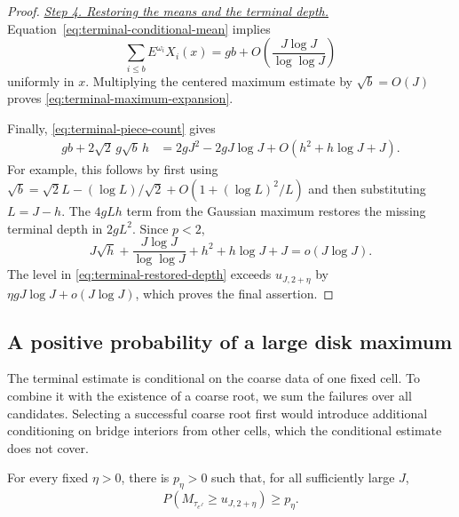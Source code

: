 \begin{proof}
\smallskip\noindent
\underline{\textit{Step 4. Restoring the means and the terminal depth.}}
Equation~\eqref{eq:terminal-conditional-mean} implies
\[
 \sum_{i\le b}E^{\omega_i}X_i(x)
 =gb+O\left(\frac{J\log J}{\log\log J}\right)
\]
uniformly in $x$.  Multiplying the centered maximum estimate by
$\sqrt b=O(J)$ proves \eqref{eq:terminal-maximum-expansion}.

Finally, \eqref{eq:terminal-piece-count} gives
\begin{equation}
 \begin{split}
 gb+2\sqrt2\,g\sqrt b\,h
 &=2gJ^2-2gJ\log J+O(h^2+h\log J+J).
 \end{split}
 \tag{73}\label{eq:terminal-restored-depth}
\end{equation}
For example, this follows by first using
$\sqrt b=\sqrt2L-(\log L)/\sqrt2+O(1+(\log L)^2/L)$ and
then substituting $L=J-h$.  The $4gLh$ term from the Gaussian
maximum restores the missing terminal depth in $2gL^2$.
Since $p<2$,
\[
 J\sqrt h+\frac{J\log J}{\log\log J}
 +h^2+h\log J+J=o(J\log J).
\]
The level in \eqref{eq:terminal-restored-depth} exceeds
$u_{J,2+\eta}$ by $\eta gJ\log J+o(J\log J)$, which proves
the final assertion.
\end{proof}

\subsection{A positive probability of a large disk maximum}
\label{sec:disk-lower}

The terminal estimate is conditional on the coarse data of one
fixed cell.  To combine it with the existence of a coarse root, we
sum the failures over all candidates.  Selecting a successful coarse
root first would introduce additional conditioning on bridge
interiors from other cells, which the conditional estimate does not
cover.

\begin{proposition}
\label{prop:disk-maximum-lower}
For every fixed $\eta>0$, there is $p_\eta>0$ such that, for all
sufficiently large $J$,
\begin{equation}
 P\left(M_{\tau_{e^J}}\ge u_{J,2+\eta}\right)\ge p_\eta.
 \tag{74}\label{eq:disk-maximum-positive-probability}
\end{equation}
\end{proposition}


